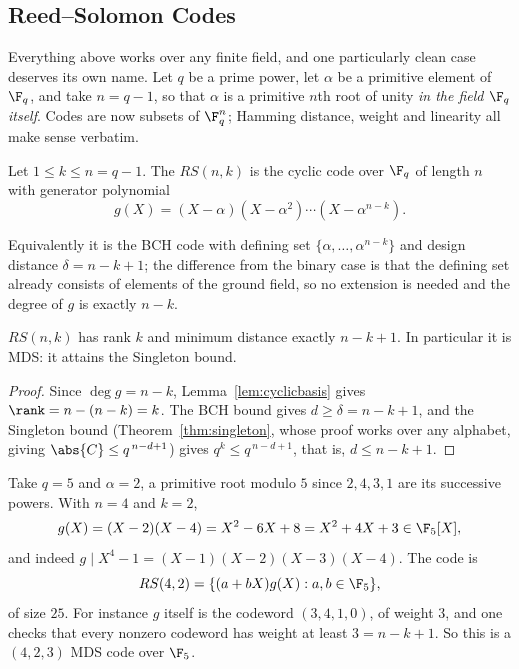 \subsection{Reed--Solomon Codes}

Everything above works over any finite field, and one particularly clean case deserves its own name. Let $q$ be a prime power, let $\alpha$ be a primitive element of $\F_q$, and take $n = q-1$, so that $\alpha$ is a primitive $n$th root of unity \emph{in the field $\F_q$ itself}. Codes are now subsets of $\F_q^n$; Hamming distance, weight and linearity all make sense verbatim.

\begin{definition}
	Let $1 \le k \le n = q-1$. The  $RS(n,k)$ is the cyclic code over $\F_q$ of length $n$ with generator polynomial
	$$g(X) = (X-\alpha)(X-\alpha^2)\cdots(X-\alpha^{n-k}).$$
\end{definition}

Equivalently it is the BCH code with defining set $\{\alpha,\dots,\alpha^{n-k}\}$ and design distance $\delta = n-k+1$; the difference from the binary case is that the defining set already consists of elements of the ground field, so no extension is needed and the degree of $g$ is exactly $n - k$.

\begin{proposition}
	$RS(n,k)$ has rank $k$ and minimum distance exactly $n-k+1$. In particular it is MDS: it attains the Singleton bound.
\end{proposition}

\begin{proof}
	Since $\deg g = n-k$, Lemma~\ref{lem:cyclicbasis} gives $\rank = n - (n-k) = k$. The BCH bound gives $d \ge \delta = n-k+1$, and the Singleton bound (Theorem~\ref{thm:singleton}, whose proof works over any alphabet, giving $\abs{C}\le q^{\,n-d+1}$) gives $q^k \le q^{\,n-d+1}$, that is, $d \le n-k+1$.
\end{proof}

\begin{example}
	Take $q = 5$ and $\alpha = 2$, a primitive root modulo $5$ since $2,4,3,1$ are its successive powers. With $n = 4$ and $k = 2$,
	$$g(X) = (X-2)(X-4) = X^2-6X+8 = X^2+4X+3 \in \F_5[X],$$
	and indeed $g \mid X^4-1 = (X-1)(X-2)(X-3)(X-4)$. The code is
	$$RS(4,2) = \{(a+bX)g(X) : a,b\in\F_5\},$$
	of size $25$. For instance $g$ itself is the codeword $(3,4,1,0)$, of weight $3$, and one checks that every nonzero codeword has weight at least $3 = n-k+1$. So this is a $(4,2,3)$ MDS code over $\F_5$.
\end{example}


